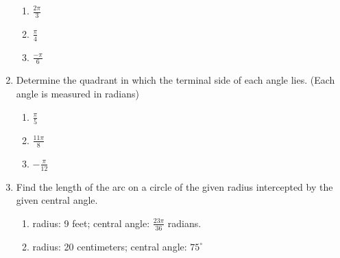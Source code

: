 \documentclass[12pt]{article}
\newif\ifans
\begin{document}
\begin{enumerate}
\begin{enumerate}
\item $\displaystyle \frac{2\pi}{3}$

\ifans \fbox{$\displaystyle 120^{\circ}$} \fi

\item $\displaystyle \frac{\pi}{4}$

\ifans \fbox{$\displaystyle 45^{\circ}$} \fi

\item $\displaystyle \frac{-\pi}{6}$

\ifans \fbox{$\displaystyle -30^{\circ}$} \fi

\end{enumerate}

\item Determine the quadrant in which the terminal side of each angle lies. \newline (Each angle is measured in radians)

\begin{enumerate}

\item $\displaystyle \frac{\pi}{5}$

\ifans \fbox{Quadrant I} \fi

\item $\displaystyle \frac{11\pi}{8}$

\ifans \fbox{Quadrant III} \fi

\item $\displaystyle -\frac{\pi}{12}$

\ifans \fbox{Quadrant IV} \fi

\end{enumerate}

\item Find the length of the arc on a circle of the given radius intercepted by the given central angle.  

\begin{enumerate}

\item radius: 9 feet; central angle: $\frac{23\pi}{36}$ radians.

\ifans \fbox{$\displaystyle \frac{23\pi}{4}$ feet} \fi

\item radius: 20 centimeters; central angle: $75^{\circ}$

\ifans \fbox{$\displaystyle \frac{25\pi}{3}$ centimeters} \fi

\end{enumerate}

\newpage


\end{enumerate}
\end{document}
